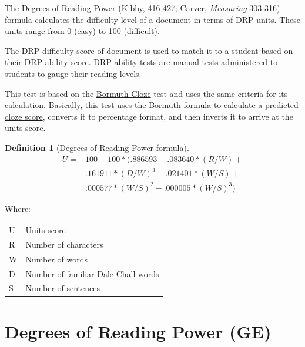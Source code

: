 \documentclass[
]{book}
\theoremstyle{definition}
\newtheorem{definition}{Definition}[chapter]
\theoremstyle{definition}
\theoremstyle{definition}
\theoremstyle{definition}
\theoremstyle{remark}
\begin{document}
The Degrees of Reading Power (Kibby, 416-427; Carver, \emph{Measuring} 303-316) formula calculates the difficulty level of a document in terms of DRP units. These units range from 0 (easy) to 100 (difficult).

The DRP difficulty score of document is used to match it to a student based on their DRP ability score. DRP ability tests are manual tests administered to students to gauge their reading levels.

This test is based on the \protect\hyperlink{bormuth-cloze-mean-machine-passage}{Bormuth Cloze} test and uses the same criteria for its calculation. Basically, this test uses the Bormuth formula to calculate a \protect\hyperlink{cloze}{predicted cloze score}, converts it to percentage format, and then inverts it to arrive at the units score.

\begin{definition}[Degrees of Reading Power formula]
\protect\hypertarget{def:drp}{}{\label{def:drp} {} }\begin{align*}
  U = & 100 - 100*(.886593 - .083640*(R/W) + \\
      & .161911*(D/W)^3 - .021401*(W/S) + \\
      & .000577*(W/S)^2 - .000005*(W/S)^3)
\end{align*}
\end{definition}

Where:

\begin{longtable}[]{@{}
  >{\raggedright\arraybackslash}p{}
  >{\raggedright\arraybackslash}p{}@{}}
\toprule
\endhead
U & Units score \\
R & Number of characters \\
W & Number of words \\
D & Number of familiar \protect\hyperlink{dale-chall-test}{Dale-Chall} words \\
S & Number of sentences \\
\bottomrule
\end{longtable}


\newpage

\hypertarget{degrees-of-reading-power-grade-equivalent}{%
\section{\texorpdfstring{Degrees of Reading Power (GE)}{Degrees of Reading Power (GE)}}\label{degrees-of-reading-power-grade-equivalent}}
\end{document}
